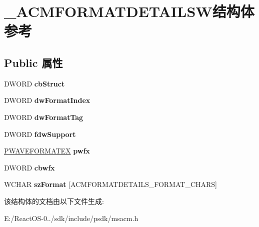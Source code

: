 \hypertarget{struct___a_c_m_f_o_r_m_a_t_d_e_t_a_i_l_s_w}{}\section{\+\_\+\+A\+C\+M\+F\+O\+R\+M\+A\+T\+D\+E\+T\+A\+I\+L\+S\+W结构体 参考}
\label{struct___a_c_m_f_o_r_m_a_t_d_e_t_a_i_l_s_w}
\subsection*{Public 属性}
\begin{DoxyCompactItemize}
\item 
\mbox{\label{struct___a_c_m_f_o_r_m_a_t_d_e_t_a_i_l_s_w_af10f552f4ed315fb393224ee1dee0b05}} 
D\+W\+O\+RD {\bfseries cb\+Struct}
\item 
\mbox{\label{struct___a_c_m_f_o_r_m_a_t_d_e_t_a_i_l_s_w_ab08b78e55daa847ed3cd277d75f4aa92}} 
D\+W\+O\+RD {\bfseries dw\+Format\+Index}
\item 
\mbox{\label{struct___a_c_m_f_o_r_m_a_t_d_e_t_a_i_l_s_w_a843392e89c4e9112c7c9879fd6e9b169}} 
D\+W\+O\+RD {\bfseries dw\+Format\+Tag}
\item 
\mbox{\label{struct___a_c_m_f_o_r_m_a_t_d_e_t_a_i_l_s_w_acd20c7c0aea7619500a32afc5d899473}} 
D\+W\+O\+RD {\bfseries fdw\+Support}
\item 
\mbox{\label{struct___a_c_m_f_o_r_m_a_t_d_e_t_a_i_l_s_w_aee1aafc2770e74f92c0552c2a3d3a64e}} 
\hyperlink{struct___w_a_v_e_f_o_r_m_a_t_e_x}{P\+W\+A\+V\+E\+F\+O\+R\+M\+A\+T\+EX} {\bfseries pwfx}
\item 
\mbox{\label{struct___a_c_m_f_o_r_m_a_t_d_e_t_a_i_l_s_w_af97ac1c79c75f1d6c99db63a319656b4}} 
D\+W\+O\+RD {\bfseries cbwfx}
\item 
\mbox{\label{struct___a_c_m_f_o_r_m_a_t_d_e_t_a_i_l_s_w_a7dfd452e231b322ea205dcfa7337f097}} 
W\+C\+H\+AR {\bfseries sz\+Format} \mbox{[}A\+C\+M\+F\+O\+R\+M\+A\+T\+D\+E\+T\+A\+I\+L\+S\+\_\+\+F\+O\+R\+M\+A\+T\+\_\+\+C\+H\+A\+RS\mbox{]}
\end{DoxyCompactItemize}


该结构体的文档由以下文件生成\+:\begin{DoxyCompactItemize}
\item 
E\+:/\+React\+O\+S-\/0../sdk/include/psdk/msacm.\+h\end{DoxyCompactItemize}
